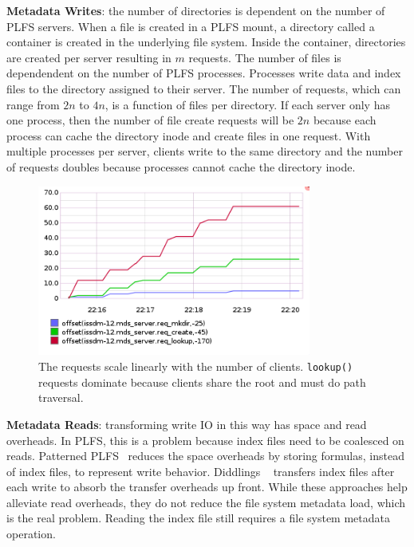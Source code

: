 
\textbf{Metadata Writes}: the number of directories is dependent on the number
of PLFS servers. When a file is created in a PLFS mount, a directory called a
container is created in the underlying file system. Inside the container,
directories are created per server resulting in \(m\) requests. The number of
files is dependendent on the number of PLFS processes. Processes write data and
index files to the directory assigned to their server. The number of requests,
which can range from \(2n\) to \(4n\), is a function of files per directory.
If each server only has one process, then the number of file create requests
will be \(2n\) because each process can cache the directory inode and create
files in one request. With multiple processes per server, clients write to the
same directory and the number of requests doubles because processes cannot
cache the directory inode.

\begin{figure}[tb]
\centering
  \includegraphics[width=90mm]{figures/prob_reqs.png} 
  \caption{The requests scale linearly with the number of clients.
  \texttt{lookup()} requests dominate because clients share the root and must do
  path traversal.
  }\label{fig:arch}
\end{figure}

\textbf{Metadata Reads}: transforming write IO in this way has space and read
overheads. In PLFS, this is a problem because index files need to be coalesced
on reads.  Patterned PLFS~\cite{he:hpdc13-plfs-patterns} reduces the space
overheads by storing formulas, instead of index files, to represent write
behavior. Diddlings ~\cite{grider:pc17-diddlings} transfers index files after
each write to absorb the transfer overheads up front. While these approaches
help alleviate read overheads, they do not reduce the file system metadata
load, which is the real problem. Reading the index file still requires a file
system metadata operation.

